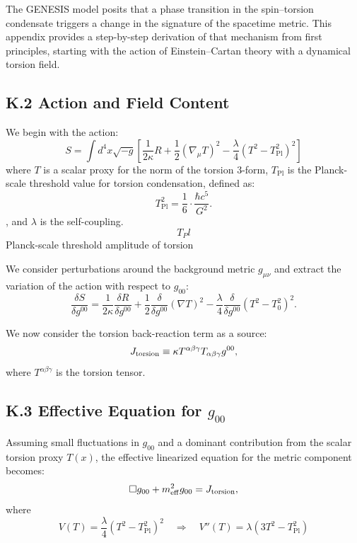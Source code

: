 \documentclass{article}
\begin{document}
The GENESIS model posits that a phase transition in the spin--torsion condensate triggers a change in the signature of the spacetime metric. This appendix provides a step-by-step derivation of that mechanism from first principles, starting with the action of Einstein--Cartan theory with a dynamical torsion field.

\subsection*{K.2 Action and Field Content}
We begin with the action:
\begin{equation}
S = \int d^4x \sqrt{-g} \left[ \frac{1}{2\kappa} R + \frac{1}{2} (\nabla_\mu T)^2 - \frac{\lambda}{4}(T^2 - T_{\mathrm{Pl}}^2)^2 \right]
\end{equation}
where $T$ is a scalar proxy for the norm of the torsion 3-form, \( T_{\mathrm{Pl}} \) is the Planck-scale threshold value for torsion condensation, defined as:
\begin{equation}\label{eq:auto219}
T_{\mathrm{Pl}}^2 = \frac{1}{6} \cdot \frac{\hbar c^5}{G^2}.
\end{equation}
, and $\lambda$ is the self-coupling.
 \begin{equation}T_Pl\end{equation} Planck-scale threshold amplitude of torsion


We consider perturbations around the background metric $g_{\mu\nu}$ and extract the variation of the action with respect to $g_{00}$:
\begin{equation}
\frac{\delta S}{\delta g^{00}} = \frac{1}{2\kappa} \frac{\delta R}{\delta g^{00}} + \frac{1}{2} \frac{\delta}{\delta g^{00}} \left(\nabla T\right)^2 - \frac{\lambda}{4} \frac{\delta}{\delta g^{00}} (T^2 - T_0^2)^2.
\end{equation}

We now consider the torsion back-reaction term as a source:
\begin{equation}
J_{\rm torsion} \equiv \kappa T^{\alpha\beta\gamma} T_{\alpha\beta\gamma} g^{00},
\end{equation}
where $T^{\alpha\beta\gamma}$ is the torsion tensor.

\subsection*{K.3 Effective Equation for $g_{00}$}
Assuming small fluctuations in $g_{00}$ and a dominant contribution from the scalar torsion proxy $T(x)$, the effective linearized equation for the metric component becomes:
\begin{equation}
\square g_{00} + m_{\rm eff}^2 g_{00} = J_{\rm torsion},
\end{equation}
where
\begin{equation}
V(T) = \frac{\lambda}{4}(T^2 - T_{\mathrm{Pl}}^2)^2 \quad \Rightarrow \quad V''(T) = \lambda(3T^2 - T_{\mathrm{Pl}}^2)
\end{equation}
\end{document}

